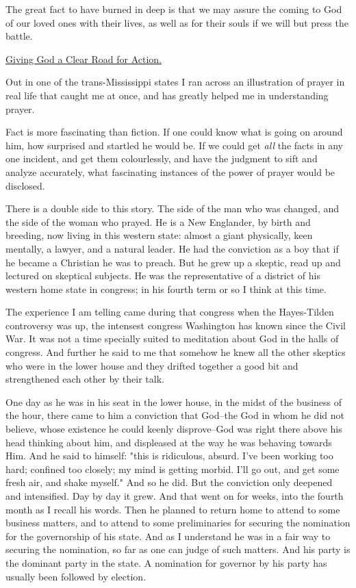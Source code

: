 The great fact to have burned in deep is that we may assure the coming to
God of our loved ones with their lives, as well as for their souls if we
will but press the battle.



\underline{Giving God a Clear Road for Action.}


Out in one of the trans-Mississippi states I ran across an illustration of
prayer in real life that caught me at once, and has greatly helped me in
understanding prayer.

Fact is more fascinating than fiction. If one could know what is going on
around him, how surprised and startled he would be. If we could get \textit{all}
the facts in any one incident, and get them colourlessly, and have the
judgment to sift and analyze accurately, what fascinating instances of the
power of prayer would be disclosed.

There is a double side to this story. The side of the man who was changed,
and the side of the woman who prayed. He is a New Englander, by birth and
breeding, now living in this western state: almost a giant physically,
keen mentally, a lawyer, and a natural leader. He had the conviction as a
boy that if he became a Christian he was to preach. But he grew up a
skeptic, read up and lectured on skeptical subjects. He was the
representative of a district of his western home state in congress; in his
fourth term or so I think at this time.

The experience I am telling came during that congress when the
Hayes-Tilden controversy was up, the intensest congress Washington has
known since the Civil War. It was not a time specially suited to
meditation about God in the halls of congress. And further he said to me
that somehow he knew all the other skeptics who were in the lower house
and they drifted together a good bit and strengthened each other by their
talk.

One day as he was in his seat in the lower house, in the midst of the
business of the hour, there came to him a conviction that God--the God in
whom he did not believe, whose existence he could keenly disprove--God was
right there above his head thinking about him, and displeased at the way
he was behaving towards Him. And he said to himself: "this is ridiculous,
absurd. I've been working too hard; confined too closely; my mind is
getting morbid. I'll go out, and get some fresh air, and shake myself."
And so he did. But the conviction only deepened and intensified. Day by
day it grew. And that went on for weeks, into the fourth month as I recall
his words. Then he planned to return home to attend to some business
matters, and to attend to some preliminaries for securing the nomination
for the governorship of his state. And as I understand he was in a fair
way to securing the nomination, so far as one can judge of such matters.
And his party is the dominant party in the state. A nomination for
governor by his party has usually been followed by election.

